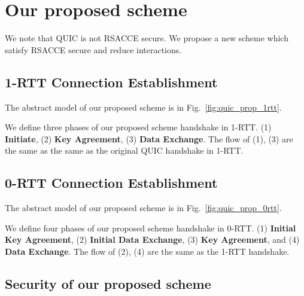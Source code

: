 \section{Our proposed scheme} \label{sec:proposed_scheme}

We note that QUIC is not RSACCE secure.
We propose a new scheme which satisfy RSACCE secure and
reduce interactions.

\subsection{1-RTT Connection Establishment} \label{sec:quic_prop_1rtt}

The abstract model of our proposed scheme is in
Fig.~\ref{fig:quic_prop_1rtt}.



We define three phases of our proposed scheme handshake in 1-RTT.
(1) \textbf{Initiate},
(2) \textbf{Key Agreement},
(3) \textbf{Data Exchange}.
The flow of (1), (3) are the same as the same as the original QUIC
handshake in 1-RTT.



\subsection{0-RTT Connection Establishment} \label{sec:quic_prop_0rtt}

The abstract model of our proposed scheme is in
Fig.~\ref{fig:quic_prop_0rtt}.



We define four phases of our proposed scheme handshake in 0-RTT.
(1) \textbf{Initial Key Agreement},
(2) \textbf{Initial Data Exchange},
(3) \textbf{Key Agreement}, and
(4) \textbf{Data Exchange}.
The flow of (2), (4) are the same as the 1-RTT
handshake.


% 


\subsection{Security of our proposed scheme} \label{sec:quic_proof}

